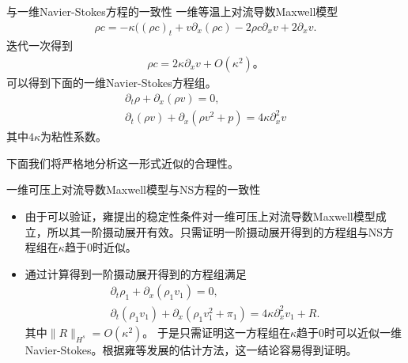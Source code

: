 \documentclass[mathserif]{beamer}
\begin{document}
\begin{frame}{与一维Navier-Stokes方程的一致性}
一维等温上对流导数Maxwell模型
\begin{eqnarray*}
 \rho c= -\kappa(( \rho c)_t + v \partial_x (\rho c) - 2 \rho c \partial_x v + 2 \partial_x v.
\end{eqnarray*}
迭代一次得到
\begin{eqnarray*}
  \rho c = 2 \kappa \partial_x v + O(\kappa^2)。
\end{eqnarray*}
可以得到下面的一维Navier-Stokes方程组。
\begin{align*}%
  \partial_t \rho + \partial_x (\rho v ) = 0, \nonumber \\
  \partial_t (\rho v) + \partial_x( \rho v^2 + p) = 4 \kappa \partial^2_x v
\end{align*}
其中$4\kappa$为粘性系数。

下面我们将严格地分析这一形式近似的合理性。
\end{frame}

\begin{frame}{一维可压上对流导数Maxwell模型与NS方程的一致性}
\begin{itemize}
\item<2-> 由于可以验证，雍提出的稳定性条件对一维可压上对流导数Maxwell模型成立，所以其一阶摄动展开有效。只需证明一阶摄动展开得到的方程组与NS方程组在$\kappa$趋于$0$时近似。
\item<3-> 通过计算得到一阶摄动展开得到的方程组满足
\begin{eqnarray*}
	  \partial_t \rho_1 + \partial_x (\rho_1 v_1 ) = 0, \\
  \partial_t (\rho_1 v_1) + \partial_x( \rho_1 v_1^2 + \pi_1) = 4 \kappa \partial^2_x v_1 + R.
\end{eqnarray*}
其中$\|R\|_{H^s} = O(\kappa^2)$。
\pause\pause
于是只需证明这一方程组在$\kappa$趋于$0$时可以近似一维Navier-Stokes。根据雍等发展的估计方法，这一结论容易得到证明。
\end{itemize}
\end{frame}




\end{document}
